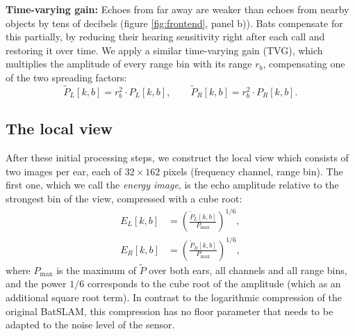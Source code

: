 \documentclass[journal]{IEEEtran}
\begin{document}
\textbf{Time-varying gain:} Echoes from far away are weaker than echoes from nearby objects by tens of decibels (figure \ref{fig:frontend}, panel b)). Bats compensate for this partially, by reducing their hearing sensitivity right after each call and restoring it over time. We apply a similar time-varying gain (TVG), which multiplies the amplitude of every range bin with its range $r_b$, compensating one of the two spreading factors:
\begin{equation}
\tilde{P}_L[k,b] = r_b^2 \cdot P_L[k,b], \qquad \tilde{P}_R[k,b] = r_b^2 \cdot P_R[k,b].
\end{equation}

\subsection{The local view}
After these initial processing steps, we construct the local view which consists of two images per ear, each of $32 \times 162$ pixels (frequency channel, range bin). The first one, which we call the \emph{energy image}, is the echo amplitude relative to the strongest bin of the view, compressed with a cube root:
\begin{equation}
\begin{aligned}
E_L[k,b] &= \left( \frac{\tilde{P}_L[k,b]}{P_{\max}} \right)^{1/6}, \\
E_R[k,b] &= \left( \frac{\tilde{P}_R[k,b]}{P_{\max}} \right)^{1/6},
\end{aligned}
\end{equation}
%
where $P_{\max}$ is the maximum of $\tilde{P}$ over both ears, all channels and all range bins, and the power $1/6$ corresponds to the cube root of the amplitude (which as an additional square root term). In contrast to the logarithmic compression of the original BatSLAM, this compression has no floor parameter that needs to be adapted to the noise level of the sensor.
\end{document}
